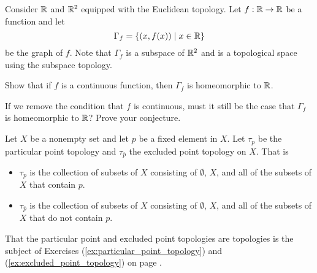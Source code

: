 \item Consider $\mathbb{R}$ and $\mathbb{R}^2$ equipped with the Euclidean topology. Let $f : \mathbb{R} \to \mathbb{R}$ be a function and let 
\[\Gamma_f = \{(x,f(x)) \mid x \in \mathbb{R}\}\]
be the graph of $f$. Note that $\Gamma_f$ is a subspace of $\mathbb{R}^2$ and is a topological space using the subspace topology. 
	\ba
	\item Show that if $f$ is a continuous function, then $\Gamma_f$ is homeomorphic to $\mathbb{R}$. 
	
	\item If we remove the condition that $f$ is continuous, must it still be the case that $\Gamma_f$ is homeomorphic to $\mathbb{R}$? Prove your conjecture.
	
	\ea

\begin{comment}

\ExerciseSolution
	\ba
	\item Define $g: \R \to \Gamma_f$ by $g(x) = (x,f(x))$. Clearly, $g$ is a surjection. If $x \neq y$ in $\R$, then $(x,f(x)) \neq (y,f(y))$ and so $g$ is also an injection. Note that $g^{-1} : \Gamma_f \to R$ is defied by $g^{-1}((x,f(x)) = x = p_1|_{\Gamma_f}$, the restriction of the projection function to $\Gamma_f$. So $g^{-1}$ is continuous. It remains to show that $g$ is continuous. Recall that a basis for the open sets in $\R^2$ is the set $U \times V$, where $U$ and $V$ are open sets in $\R$. Let $O = \Gamma_f \cap (U \times V)$ for some open sets $U$ and $V$ in $\R$. Then $O =  \{(x,f(x)) \mid x \in U\}$. It follows that $g^{-1}(O) =U$, which is an open set in $\R$.  Since $g$ is a continuous bijection whose inverse is continuous, we conclude that $g$ is a homeomorphism, and that $\Gamma_f$ is homeomorphic to $\R$.  
 
	\item Consider the function $f: \R \to \R$ defined by $f(x) = \begin{cases} 1&\text{ if } x \geq 0 \\ -1 &\text{ if } x < 0.\end{cases}$ Then the graph of $f$ has two connected components, while $\R$ has only one. So $\Gamma_f$ is not homeomorphic to $\R$. 
	
	\ea	
	
\end{comment}	


\item Let $X$ be a nonempty set and let $p$ be a fixed element in $X$. Let $\tau_p$ be the particular point topology and $\tau_{\overline{p}}$ the excluded point topology on $X$. That is
\begin{itemize}
\item $\tau_{p}$ is the collection of subsets of $X$ consisting of $\emptyset$, $X$, and all of the subsets of $X$ that contain $p$.  
\item $\tau_{\overline{p}}$ is the collection of subsets of $X$ consisting of $\emptyset$, $X$, and all of the subsets of $X$ that do not contain $p$.
\end{itemize}
That the particular point and excluded point topologies are topologies is the subject of Exercises (\ref{ex:particular_point_topology}) and (\ref{ex:excluded_point_topology}) on page \pageref{ex:particular_point_topology}. 

